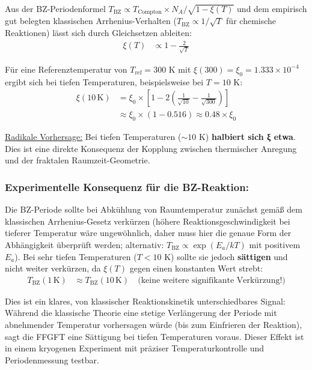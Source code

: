 \documentclass[12pt,a4paper]{article}
\begin{document}
	Aus der BZ-Periodenformel $T_{\text{BZ}} \propto T_{\text{Compton}} \times N_A / \sqrt{1 - \xi(T)}$ und dem empirisch gut belegten klassischen Arrhenius-Verhalten ($T_{\text{BZ}} \propto 1/\sqrt{T}$ für chemische Reaktionen) lässt sich durch Gleichsetzen ableiten:
	\begin{align*}
		\xi(T) &\propto 1 - \frac{2}{\sqrt{T}}
	\end{align*}
	
	Für eine Referenztemperatur von $T_{\text{ref}} = 300$ K mit $\xi(300) = \xi_0 = 1.333 \times 10^{-4}$ ergibt sich bei tiefen Temperaturen, beispielsweise bei $T = 10$ K:
	\begin{align*}
		\xi(10 \, \text{K}) &= \xi_0 \times \left[1 - 2\left(\frac{1}{\sqrt{10}} - \frac{1}{\sqrt{300}}\right)\right] \\
		&\approx \xi_0 \times (1 - 0.516) \approx 0.48 \times \xi_0
	\end{align*}
	
	\underline{Radikale Vorhersage:} Bei tiefen Temperaturen ($\sim 10$ K) \textbf{halbiert sich ξ etwa}. Dies ist eine direkte Konsequenz der Kopplung zwischen thermischer Anregung und der fraktalen Raumzeit-Geometrie.
	
	\subsubsection*{Experimentelle Konsequenz für die BZ-Reaktion:}
	
	Die BZ-Periode sollte bei Abkühlung von Raumtemperatur zunächst gemäß dem klassischen Arrhenius-Gesetz verkürzen (höhere Reaktionsgeschwindigkeit bei tieferer Temperatur wäre ungewöhnlich, daher muss hier die genaue Form der Abhängigkeit überprüft werden; alternativ: $T_{\text{BZ}} \propto \exp(E_a/kT)$ mit positivem $E_a$). Bei sehr tiefen Temperaturen ($T < 10$ K) sollte sie jedoch \textbf{sättigen} und nicht weiter verkürzen, da $\xi(T)$ gegen einen konstanten Wert strebt:
	\begin{align*}
		T_{\text{BZ}}(1 \, \text{K}) &\approx T_{\text{BZ}}(10 \, \text{K}) \quad \text{(keine weitere signifikante Verkürzung!)}
	\end{align*}
	
	Dies ist ein klares, von klassischer Reaktionskinetik unterschiedbares Signal: Während die klassische Theorie eine stetige Verlängerung der Periode mit abnehmender Temperatur vorhersagen würde (bis zum Einfrieren der Reaktion), sagt die FFGFT eine Sättigung bei tiefen Temperaturen voraus. Dieser Effekt ist in einem kryogenen Experiment mit präziser Temperaturkontrolle und Periodenmessung testbar.
	
\end{document}
